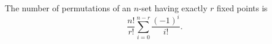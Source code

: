 The number of permutations of an $n$-set having exactly $r$ fixed points is
$$\frac{n!}{r!} \sum_{i=0}^{n-r} \frac{(-1)^i}{i!}.$$
